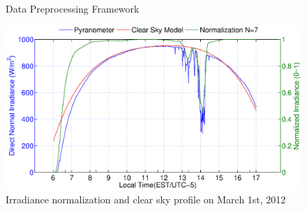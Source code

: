 \documentclass[conference]{IEEEtran}
\begin{document}
% 

\begin{figure}[tb]
\centering
{}
\caption{Data Preprocessing Framework}
\end{figure}

%
\begin{figure}[tb]
\centering
\includegraphics[width=3.2 in]{pics/csfit}
\caption{Irradiance normalization and clear sky profile on March 1st, 2012}
\label{fig:csfig}
\end{figure}
%
\end{document}
